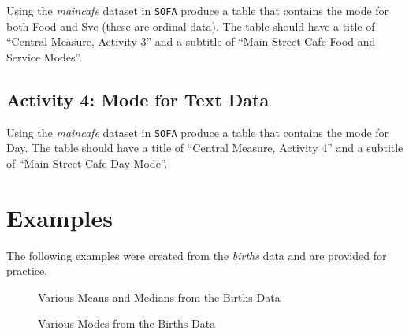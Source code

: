 Using the \textit{maincafe} dataset in \texttt{SOFA} produce a table that contains the mode for both Food and Svc (these are ordinal data). The table should have a title of ``Central Measure, Activity 3'' and a subtitle of ``Main Street Cafe Food and Service Modes''.

\subsection{Activity 4: Mode for Text Data} \label{cen:act04}

Using the \textit{maincafe} dataset in \texttt{SOFA} produce a table that contains the mode for Day. The table should have a title of ``Central Measure, Activity 4'' and a subtitle of ``Main Street Cafe Day Mode''.

\section{Examples}

The following examples were created from the \textit{births} data and are provided for practice.

\begin{figure}[H]
  \begin{center}
    \caption{Various Means and Medians from the Births Data}
  \end{center}
\end{figure}

\begin{figure}[H]
  \begin{center}
    \caption{Various Modes from the Births Data}
  \end{center}
\end{figure}

